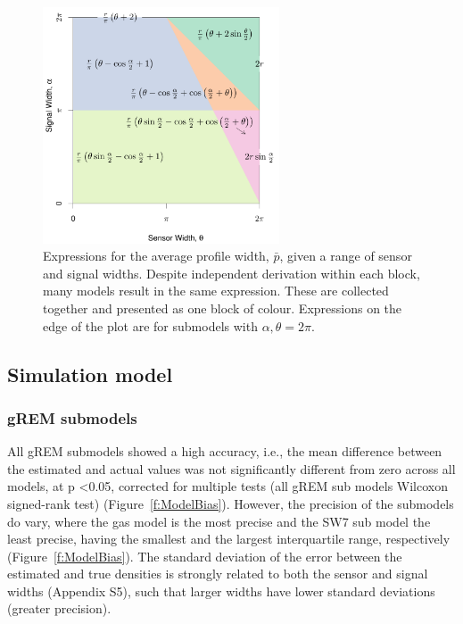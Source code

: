 \documentclass[a4paper,10pt,reqno,oneside]{amsart}
\begin{document}
\begin{figure}
	\centering
	\includegraphics[width=7cm]{imgs/equalModelResults.pdf}
	\caption{Expressions for the average profile width, $\bar{p}$, given a range of sensor and signal widths. Despite independent derivation within each block, many models result in the same expression. These are collected together and presented as one block of colour. Expressions on the edge of the plot are for submodels with $\alpha, \theta = 2\pi$. }
	\label{f:equalModelResults}
\end{figure}



\subsection*{Simulation model}

\subsubsection*{gREM submodels}
All gREM submodels showed a high accuracy, i.e., the mean difference between the estimated and actual values was not significantly different from zero across all models, at p \textless 0.05, corrected for multiple tests (all gREM sub models Wilcoxon signed-rank test) (Figure~\ref{f:ModelBias}). However, the precision of the submodels do vary, where the gas model is the most precise and the SW7 sub model the least precise, having the smallest and the largest interquartile range, respectively (Figure~\ref{f:ModelBias}). The standard deviation of the error between the estimated and true densities is strongly related to both the sensor and signal widths (Appendix S5), such that larger widths have lower standard deviations (greater precision).
\end{document}
